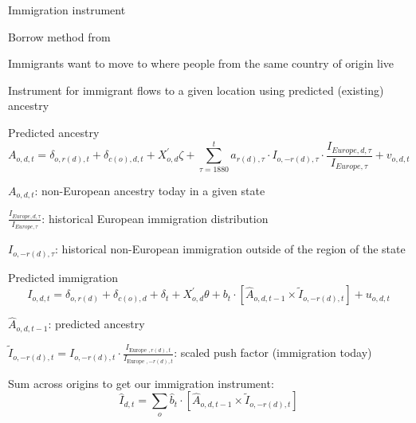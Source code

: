 \documentclass[aspectratio=169]{beamer}
\newenvironment{wideitemize}{\itemize\addtolength{\itemsep}{10pt}}{\enditemize}
\begin{document}
\begin{frame}{Immigration instrument}
    \begin{wideitemize}
        \item Borrow method from \textcite{burchardi_chaney_hassan_tarquinio_terry_NBERWP_2020_immigration_innovation}
        \item Immigrants want to move to where people from the same country of origin live
        \item Instrument for immigrant flows to a given location using predicted (existing) ancestry
    \end{wideitemize}
\end{frame}

\begin{frame}{Predicted ancestry}
    \begin{equation*}
        A_{o, d, t} = \delta_{o, r(d), t} + \delta_{c(o), d, t} + X_{o, d}^{\prime} \zeta+\sum_{\tau=1880}^t a_{r(d), \tau} \cdot I_{o,-r(d), \tau} \cdot \frac{I_{E u r o p e, d, \tau}}{I_{E u r o p e, \tau}} + v_{o, d, t}
    \end{equation*}
    \begin{wideitemize}
        \item $A_{o, d, t}$: non-European ancestry today in a given state
        \item $\frac{I_{E u r o p e, d, \tau}}{I_{E u r o p e, \tau}}$: historical European immigration distribution
        \item $I_{o,-r(d), \tau}$: historical non-European immigration outside of the region of the state
    \end{wideitemize}
\end{frame}

\begin{frame}{Predicted immigration}
    \begin{equation*}
        I_{o, d, t} = \delta_{o, r(d)} + \delta_{c(o), d} + \delta_t+X_{o, d}^{\prime} \theta + b_t \cdot \left[\hat{A}_{o, d, t-1} \times \tilde{I}_{o,-r(d), t}\right] + u_{o, d, t}
    \end{equation*}
    \begin{wideitemize}
        \item $\hat{A}_{o, d, t-1}$: predicted ancestry
        \item $\tilde{I}_{o,-r(d), t} = I_{o,-r(d), t} \cdot \frac{I_{\text {Europe }, r(d), t}}{I_{\text {Europe },-r(d), t}} $: scaled push factor (immigration today)
        \item Sum across origins to get our immigration instrument:
        \begin{equation*}
            \hat{I}_{d, t} = \sum_o \hat{b}_t \cdot\left[\hat{A}_{o, d, t-1} \times \tilde{I}_{o,-r(d), t}\right]
        \end{equation*}
    \end{wideitemize}
\end{frame}
\end{document}
